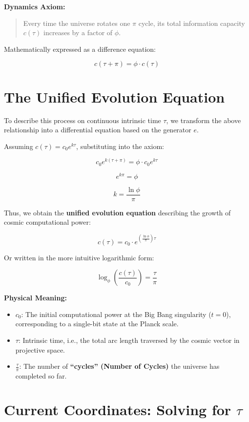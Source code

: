 \textbf{Dynamics Axiom:}

\begin{quote}
Every time the universe rotates one $\pi$ cycle, its total information capacity $c(\tau)$ increases by a factor of $\phi$.
\end{quote}

Mathematically expressed as a difference equation:

$$c(\tau + \pi) = \phi \cdot c(\tau)$$

\section{The Unified Evolution Equation}

To describe this process on continuous intrinsic time $\tau$, we transform the above relationship into a differential equation based on the generator $e$.

Assuming $c(\tau) = c_0 e^{k\tau}$, substituting into the axiom:

$$c_0 e^{k(\tau+\pi)} = \phi \cdot c_0 e^{k\tau}$$

$$e^{k\pi} = \phi$$

$$k = \frac{\ln \phi}{\pi}$$

Thus, we obtain the \textbf{unified evolution equation} describing the growth of cosmic computational power:

$$c(\tau) = c_0 \cdot e^{\left( \frac{\ln \phi}{\pi} \right) \tau}$$

Or written in the more intuitive logarithmic form:

$$\log_\phi \left( \frac{c(\tau)}{c_0} \right) = \frac{\tau}{\pi}$$

\textbf{Physical Meaning:}

\begin{itemize}
\item \textbf{$c_0$}: The initial computational power at the Big Bang singularity ($t=0$), corresponding to a single-bit state at the Planck scale.

\item \textbf{$\tau$}: Intrinsic time, i.e., the total arc length traversed by the cosmic vector in projective space.

\item \textbf{$\frac{\tau}{\pi}$}: The number of \textbf{``cycles'' (Number of Cycles)} the universe has completed so far.
\end{itemize}

\section{Current Coordinates: Solving for $\tau$}


